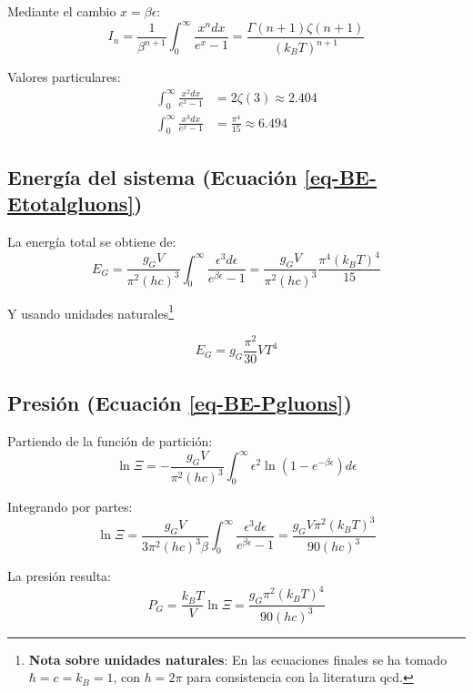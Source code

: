 Mediante el cambio $x = \beta\epsilon$:
\begin{equation}
I_n = \frac{1}{\beta^{n+1}} \int_0^\infty \frac{x^n dx}{e^x - 1} = \frac{\Gamma(n+1)\zeta(n+1)}{(k_B T)^{n+1}}
\end{equation}

Valores particulares:
\begin{align}
\int_0^\infty \frac{x^2 dx}{e^x - 1} &= 2\zeta(3) \approx 2.404 \\
\int_0^\infty \frac{x^3 dx}{e^x - 1} &= \frac{\pi^4}{15} \approx 6.494
\end{align}

\subsection{Energía del sistema (Ecuación \ref{eq-BE-Etotalgluons})}
La energía total se obtiene de:
\begin{equation}
E_G = \frac{g_G V}{\pi^2 (hc)^3} \int_0^\infty \frac{\epsilon^3 d\epsilon}{e^{\beta\epsilon} - 1} = \frac{g_G V}{\pi^2 (hc)^3} \frac{\pi^4 (k_B T)^4}{15}
\end{equation}

Y usando unidades naturales\footnote{\textbf{Nota sobre unidades naturales}: En las ecuaciones finales se ha tomado $\hbar = c = k_B = 1$, con $h = 2\pi$ para consistencia con la literatura \acrshort{qcd}.}

\begin{equation}
E_G = g_G \frac{\pi^2}{30} V T^4
\end{equation}

\subsection{Presión (Ecuación \ref{eq-BE-Pgluons})}
Partiendo de la función de partición:
\begin{equation}
\ln \Xi = -\frac{g_G V}{\pi^2 (hc)^3} \int_0^\infty \epsilon^2 \ln(1 - e^{-\beta\epsilon}) d\epsilon
\end{equation}

Integrando por partes:
\begin{equation}
\ln \Xi = \frac{g_G V}{3\pi^2 (hc)^3 \beta} \int_0^\infty \frac{\epsilon^3 d\epsilon}{e^{\beta\epsilon} - 1} = \frac{g_G V \pi^2 (k_B T)^3}{90 (hc)^3}
\end{equation}

La presión resulta:
\begin{equation}
P_G = \frac{k_B T}{V} \ln \Xi = \frac{g_G \pi^2 (k_B T)^4}{90 (hc)^3}
\end{equation}

